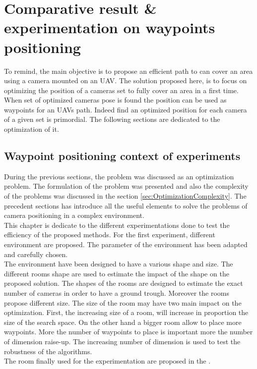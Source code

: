 \chapter{Comparative result \& experimentation on waypoints positioning } 
\minitoc
To remind, the main objective is to propose an efficient path to can cover an area using a camera mounted on an UAV. The solution proposed here, is to focus on optimizing the position of a cameras set to fully cover an area in a first time. When set of optimized cameras pose is found the position can be used as waypoints for an UAVs path. Indeed find an optimized position for each camera of a given set is primordial. The following sections are dedicated to the optimization of it. 







\section{ Waypoint  positioning context of experiments} \label{sec:contextOfExp}

 During the previous sections, the problem was discussed as an optimization problem. The formulation of the problem was presented and also the complexity of the problems was discussed in the section \ref{sec:OptimizationComplexity}. 
The precedent sections has introduce all the useful elements to solve the problems of camera positioning in a complex environment. \\
This chapter is dedicate to the different experimentations done to test the efficiency of the proposed methods. 
For the first experiment, different environment are proposed. The parameter of the environment has been adapted and carefully chosen. \\
The environment have been designed to have a various shape and size. The different rooms shape are used to estimate the impact of the shape on the proposed solution.
The shapes of the rooms are designed to estimate the exact number of cameras in order to have a ground trough.
Moreover the rooms propose different size. The size of the room may have two main impact on the optimization.
First, the increasing  size of a room, will increase in proportion the size of the search space. On the other hand a bigger room allow to place more waypoints. More the number of waypoints to place is important more the number of dimension raise-up. The increasing number of dimension is used to test the robustness of the algorithms.\\
 The room finally used for the experimentation are proposed in the .

